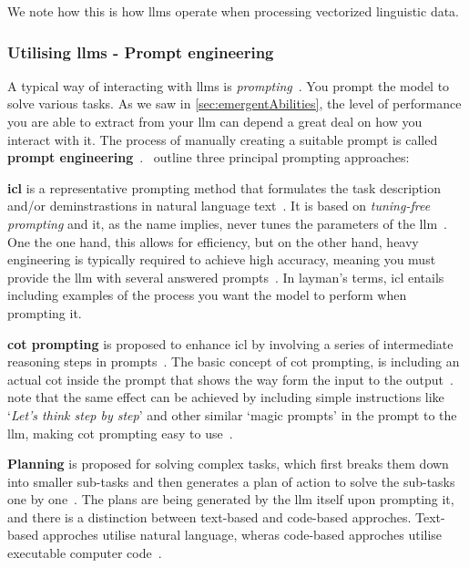 
We note how this is how \acrshort{llms} operate when processing vectorized
linguistic data.


\subsubsection{Utilising \acrshort{llms} - Prompt engineering}\label{sec:llmUtilization}


A typical way of interacting with \acrshort{llms} is \textit{prompting}~\cite[44]{llmSurvey}. You
prompt the model to solve various tasks. As we saw in \cref{sec:emergentAbilities}, the level of
performance you are able to extract from your \acrlong{llm} can depend a great deal on how you
interact with it. The process of manually creating a suitable prompt is called \textbf{prompt
    engineering}~\cite[44]{llmSurvey}.~\citeauthor{llmSurvey} outline three principal prompting
approaches:

\textbf{\acrfull{icl}} is a representative prompting method that formulates the task
description and/or deminstrastions in natural language text~\cite[44]{llmSurvey}. It is based on
\textit{tuning-free prompting} and it, as the name implies, never tunes the parameters of the
\acrshort{llm}~\cite[15]{promptingSurvey}. One the one hand, this allows for efficiency, but on the
other hand, heavy engineering is typically required to achieve high accuracy, meaning you must
provide the \acrshort{llm} with several answered prompts~\cite[16]{promptingSurvey}. In layman's
terms, \acrshort{icl} entails including examples of the process you want the model to perform when
prompting it.

\textbf{\acrfull{cot} prompting} is proposed to enhance \acrlong{icl} by involving a
series of intermediate reasoning steps in prompts~\cite[44, 52]{llmSurvey}. The basic concept of
\acrshort{cot} prompting, is including an actual \acrlong{cot} inside the prompt that shows the way
form the input to the output~\cite[52]{llmSurvey}.~\citeauthor{llmSurvey} note that the same effect
can be achieved by including simple instructions like `\textit{Let's think step by step}' and other
similar `magic prompts' in the prompt to the \acrshort{llm}, making \acrshort{cot} prompting easy to
use~\cite[52]{llmSurvey}.

\textbf{Planning} is proposed for solving complex tasks, which first breaks them down into smaller
sub-tasks and then generates a plan of action to solve the sub-tasks one by
one~\cite[44, 54]{llmSurvey}. The plans are being generated by the \acrshort{llm} itself upon
prompting it, and there is a distinction between text-based and code-based approches. Text-based
approches utilise natural language, wheras code-based approches utilise executable computer code~\cite[54-55]{llmSurvey}.


